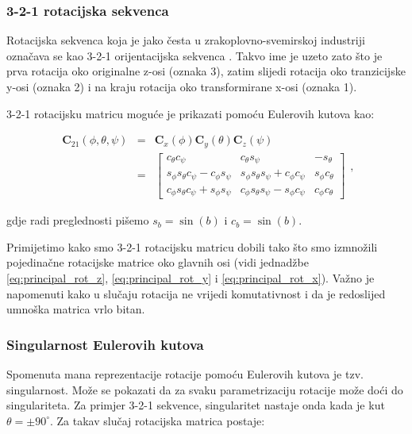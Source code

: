 \documentclass[times, utf8, diplomski, numeric]{templates/template}
\begin{document}
{{{            \subsubsection{3-2-1 rotacijska sekvenca}{
                Rotacijska sekvenca koja je jako česta u zrakoplovno-svemirskoj industriji označava se kao 3-2-1 orijentacijska sekvenca . Takvo ime je uzeto zato što je prva rotacija oko originalne z-osi (oznaka 3), zatim slijedi rotacija oko tranzicijske y-osi (oznaka 2) i na kraju rotacija oko transformirane x-osi (oznaka 1).

                3-2-1 rotacijsku matricu moguće je prikazati pomoću Eulerovih kutova kao:

                \begin{equation}
                \label{eq:euler_rot_mat}
                \begin{array}{rcl}
                \boldsymbol{C}_{21}(\phi, \theta, \psi) & = & \boldsymbol{C}_{x}(\phi) \boldsymbol{C}_{y}(\theta) \boldsymbol{C}_{z}(\psi) \\
                & = &
                \begin{bmatrix}
                    c_{\theta}c_{\psi}                            & c_{\theta}s_{\psi}                            & -s_{\theta} \\
                    s_{\phi}s_{\theta}c_{\psi} - c_{\phi}s_{\psi} & s_{\phi}s_{\theta}s_{\psi} + c_{\phi}c_{\psi} & s_{\phi}c_{\theta} \\
                    c_{\phi}s_{\theta}c_{\psi} + s_{\phi}s_{\psi} & c_{\phi}s_{\theta}s_{\psi} - s_{\phi}c_{\psi} & c_{\phi}c_{\theta}
                \end{bmatrix}
                \end{array}
                ,
                \end{equation}

                gdje radi preglednosti pišemo $s_{b}=\sin(b)$ i $c_{b}=\sin(b)$.

                Primijetimo kako smo 3-2-1 rotacijsku matricu dobili tako što smo izmnožili pojedinačne rotacijske matrice oko glavnih osi (vidi jednadžbe \ref{eq:principal_rot_z}, \ref{eq:principal_rot_y} i \ref{eq:principal_rot_x}). Važno je napomenuti kako u slučaju rotacija ne vrijedi komutativnost i da je redoslijed umnoška matrica vrlo bitan.
            }

            \subsubsection{Singularnost Eulerovih kutova}{
            \label{subsubsection:singularnost_eulerovih_kutova}
                Spomenuta mana reprezentacije rotacije pomoću Eulerovih kutova je tzv. singularnost. Može se pokazati da za svaku parametrizaciju rotacije može doći do singulariteta. Za primjer 3-2-1 sekvence, singularitet nastaje onda kada je kut $\theta=\pm90^{\circ}$. Za takav slučaj rotacijska matrica postaje:

}}}}
\end{document}
